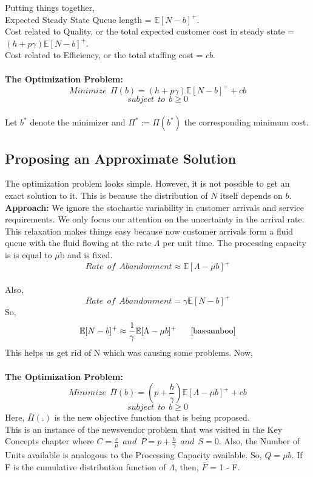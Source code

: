 Putting things together, \\
Expected Steady State Queue length = $\mathbb{E}[N - b]^+$. \\
Cost related to Quality, or the total expected customer cost in steady state = $(h + p\gamma)\mathbb{E}[N - b]^+$. \\
Cost related to Efficiency, or the total staffing cost = $cb$.\\ \\
\textbf{The Optimization Problem:}\\ 
\[Minimize \ \ \Pi(b)=(h + p\gamma)\mathbb{E}[N - b]^+ + cb\]     
\[subject \ \ to \ \ b \geq 0\]    
\\
Let $b^*$ denote the minimizer and $\Pi^* := \Pi(b^*)$ the corresponding minimum cost.
\subsection{Proposing an Approximate Solution}
The optimization problem looks simple. However, it is not possible to get an exact solution to it. This is because the distribution of $N$ itself depends on $b$. \\
\textbf{Approach:} We ignore the stochastic variability in customer arrivals and service requirements. We only focus our attention on the uncertainty in the arrival rate. This relaxation makes things easy because now customer arrivals form a fluid queue with the fluid flowing at the rate $\Lambda$ per unit time. The processing
capacity is is equal to $\mu$b and is fixed. \\
\[Rate \ \ of \ \ Abandonment \approx \mathbb{E}[\Lambda - \mu b]^+\] \\
Also, 
\[Rate \ \ of \ \ Abandonment = \gamma\mathbb{E}[N - b]^+\]
So,
\[\mathbb{E}[N - b]^+ \approx \frac{1}{\gamma} \mathbb{E}[\Lambda - \mu b]^+ \ \ \ \ \ \cite{bassamboo}  \] 
This helps us get rid of N which was causing some problems. Now, \\ \\
\textbf{The Optimization Problem:}\\ 
\[Minimize \ \ \bar{\Pi}(b)=(p + \frac{h}{\gamma})\mathbb{E}[\Lambda - \mu b]^+ + cb\]     
\[subject \ \ to \ \ b \geq 0\]     
Here, $\bar{\Pi}(.)$ is the new objective function that is being proposed. \\
This is an instance of the newsvendor problem that was visited in the Key Concepts chapter where $C=\frac{c}{\mu} \ \ and \ \ P=p + \frac{h}{\gamma} \ \ and \ \ S=0$. Also, the Number of Units available is analogous to the Processing Capacity available. So, $Q=\mu b$. If F is the cumulative distribution function of $\Lambda$, then, $\bar{F}$ = 1 - F.
